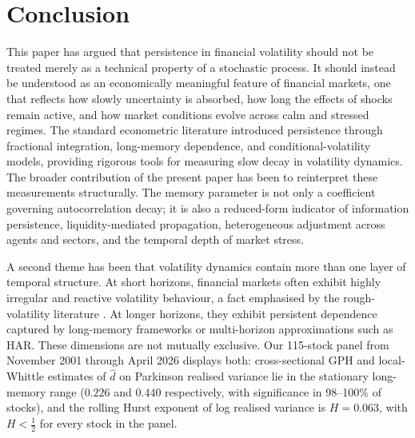 \documentclass[11pt,a4paper]{article}
\newcommand{\dhat}{\hat d}
\begin{document}
\section{Conclusion}
\label{sec:conclusion}

This paper has argued that persistence in financial volatility should
not be treated merely as a technical property of a stochastic process.
It should instead be understood as an economically meaningful feature of
financial markets, one that reflects how slowly uncertainty is absorbed,
how long the effects of shocks remain active, and how market conditions
evolve across calm and stressed regimes. The standard econometric
literature introduced persistence through fractional integration,
long-memory dependence, and conditional-volatility models, providing
rigorous tools for measuring slow decay in volatility dynamics. The
broader contribution of the present paper has been to reinterpret these
measurements structurally. The memory parameter is not only a
coefficient governing autocorrelation decay; it is also a reduced-form
indicator of information persistence, liquidity-mediated propagation,
heterogeneous adjustment across agents and sectors, and the temporal
depth of market stress.

A second theme has been that volatility dynamics contain more than one
layer of temporal structure. At short horizons, financial markets often
exhibit highly irregular and reactive volatility behaviour, a fact
emphasised by the rough-volatility literature
\citep{gatheral2018volatility}. At longer horizons, they exhibit
persistent dependence captured by long-memory frameworks or multi-horizon
approximations such as HAR. These dimensions are not mutually exclusive.
Our 115-stock panel from November 2001 through April 2026 displays
both: cross-sectional GPH and local-Whittle estimates of $\dhat$ on
Parkinson realised variance lie in the stationary long-memory range
($0.226$ and $0.440$ respectively, with significance in 98--100\% of
stocks), and the rolling Hurst exponent of log realised variance is
$H = 0.063$, with $H<\tfrac12$ for every stock in the panel.
\end{document}
